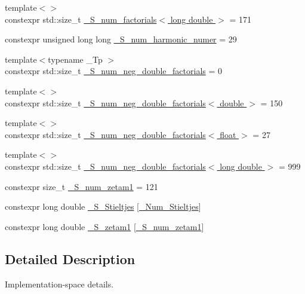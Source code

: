 \begin{DoxyCompactItemize}
\item 
{\footnotesize template$<$$>$ }\\constexpr std\+::size\+\_\+t \hyperlink{namespacestd_1_1____detail_ab90b8eb39ff963a5ed533a3be0b7f7fd}{\+\_\+\+S\+\_\+num\+\_\+factorials$<$ long double $>$} = 171
\item 
constexpr unsigned long long \hyperlink{namespacestd_1_1____detail_a554788747841f6abbfd7572673df32ad}{\+\_\+\+S\+\_\+num\+\_\+harmonic\+\_\+numer} = 29
\item 
{\footnotesize template$<$typename \+\_\+\+Tp $>$ }\\constexpr std\+::size\+\_\+t \hyperlink{namespacestd_1_1____detail_ac386f200e589ce1fc895c2aac0e47f8c}{\+\_\+\+S\+\_\+num\+\_\+neg\+\_\+double\+\_\+factorials} = 0
\item 
{\footnotesize template$<$$>$ }\\constexpr std\+::size\+\_\+t \hyperlink{namespacestd_1_1____detail_a2d14a1207a6fea22f32586dfd41cf49d}{\+\_\+\+S\+\_\+num\+\_\+neg\+\_\+double\+\_\+factorials$<$ double $>$} = 150
\item 
{\footnotesize template$<$$>$ }\\constexpr std\+::size\+\_\+t \hyperlink{namespacestd_1_1____detail_a3ce62e66e9a196fd89b4d841f7374d68}{\+\_\+\+S\+\_\+num\+\_\+neg\+\_\+double\+\_\+factorials$<$ float $>$} = 27
\item 
{\footnotesize template$<$$>$ }\\constexpr std\+::size\+\_\+t \hyperlink{namespacestd_1_1____detail_a2ef051ec96e521e71489d2327d11c22a}{\+\_\+\+S\+\_\+num\+\_\+neg\+\_\+double\+\_\+factorials$<$ long double $>$} = 999
\item 
constexpr size\+\_\+t \hyperlink{namespacestd_1_1____detail_a807e36c2aec3a9f27fdb21726cd464e2}{\+\_\+\+S\+\_\+num\+\_\+zetam1} = 121
\item 
constexpr long double \hyperlink{namespacestd_1_1____detail_acc0b5ea5ffcc30a404893f434f17a865}{\+\_\+\+S\+\_\+\+Stieltjes} \mbox{[}\hyperlink{namespacestd_1_1____detail_a20c3b4334b0ffa9a5da21768d7830894}{\+\_\+\+Num\+\_\+\+Stieltjes}\mbox{]}
\item 
constexpr long double \hyperlink{namespacestd_1_1____detail_a22ed80d9e5c3bc79e61a3cdb8e79a462}{\+\_\+\+S\+\_\+zetam1} \mbox{[}\hyperlink{namespacestd_1_1____detail_a807e36c2aec3a9f27fdb21726cd464e2}{\+\_\+\+S\+\_\+num\+\_\+zetam1}\mbox{]}
\end{DoxyCompactItemize}


\subsection{Detailed Description}
Implementation-\/space details. 

